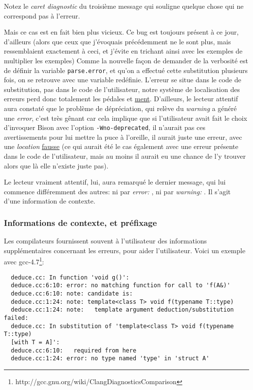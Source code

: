 \documentclass[a4paper,11pt,twoside,final]{article}
\begin{document}
  Notez le \textit{caret diagnostic} du troisième message qui souligne quelque
  chose qui ne correspond pas à l'erreur.

  Mais ce cas est en fait bien plus vicieux. Ce bug est toujours présent à ce
  jour, d'ailleurs (alors que ceux que j'évoquais précédemment ne le sont plus,
  mais ressemblaient exactement à ceci, et j'évite en trichant ainsi avec les
  exemples de multiplier les exemples) Comme la nouvelle façon de demander de
  la verbosité est de définir la variable \texttt{parse.error}, et qu'on a
  effectué cette substitution plusieurs fois, on se retrouve avec une variable
  redéfinie.  L'erreur se situe dans le code de substitution, pas dans le code
  de l'utilisateur, notre système de localisation des erreurs perd donc
  totalement les pédales et \underline{ment}. D'ailleurs, le lecteur attentif
  aura constaté que le problème de dépréciation, qui relève du \textit{warning}
  a généré une \textit{error}, c'est très gênant car cela implique que si
  l'utilisateur avait fait le choix d'invoquer Bison avec l'option
  \texttt{-Wno-deprecated}, il n'aurait pas ces avertissements pour lui mettre
  la puce à l'oreille, il aurait juste une erreur, avec une \textit{location}
  \underline{fausse} (ce qui aurait été le cas également avec une erreur
  présente dans le code de l'utilisateur, mais au moins il aurait eu une chance
  de l'y trouver alors que là elle n'existe juste pas).

  Le lecteur vraiment attentif, lui, aura remarqué le dernier message, qui lui
  commence différemment des autres: ni par \textit{error: }, ni par
  \textit{warning: }. Il s'agit d'une information de contexte.

  \subsubsection{Informations de contexte, et préfixage}

  Les compilateurs fournissent souvent à l'utilisateur des informations
  supplémentaires concernant les erreurs, pour aider l'utilisateur. Voici un
  exemple avec gcc-4.7\footnote{%
  http://gcc.gnu.org/wiki/ClangDiagnosticsComparison}:

  \begin{verbatim}
  deduce.cc: In function 'void g()':
  deduce.cc:6:10: error: no matching function for call to 'f(A&)'
  deduce.cc:6:10: note: candidate is:
  deduce.cc:1:24: note: template<class T> void f(typename T::type)
  deduce.cc:1:24: note:   template argument deduction/substitution failed:
  deduce.cc: In substitution of 'template<class T> void f(typename T::type)
  [with T = A]':
  deduce.cc:6:10:   required from here
  deduce.cc:1:24: error: no type named 'type' in 'struct A'
  \end{verbatim}
\end{document}
